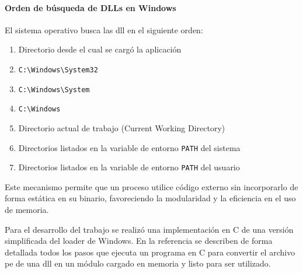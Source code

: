 \paragraph{Orden de búsqueda de DLLs en Windows}

El sistema operativo busca las \acrshort{dll} en el siguiente orden:

\begin{enumerate}
    \item Directorio desde el cual se cargó la aplicación
    \item \texttt{C:\textbackslash Windows\textbackslash System32}
    \item \texttt{C:\textbackslash Windows\textbackslash System}
    \item \texttt{C:\textbackslash Windows}
    \item Directorio actual de trabajo (Current Working Directory)
    \item Directorios listados en la variable de entorno \texttt{PATH} del sistema
    \item Directorios listados en la variable de entorno \texttt{PATH} del usuario
\end{enumerate}


Este mecanismo permite que un proceso utilice código externo sin incorporarlo de forma estática en su binario, favoreciendo la modularidad y la eficiencia en el uso de memoria.

Para el desarrollo del trabajo se realizó una implementación en C de una versión simplificada del loader de Windows. En la referencia \cite{walkingloader} se describen de forma detallada todos los pasos que ejecuta un programa en C para convertir el archivo \acrshort{pe} de una \acrshort{dll} en un módulo cargado en memoria y listo para ser utilizado.
